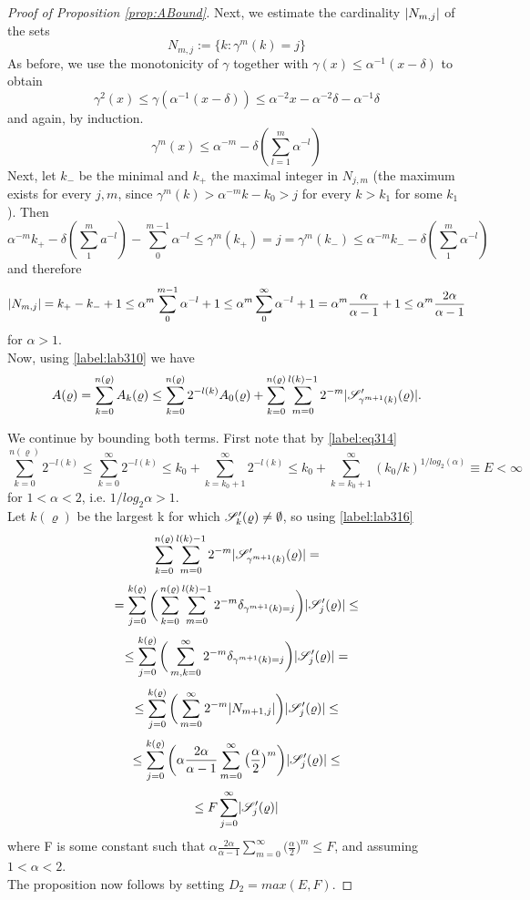 \documentclass[11pt,reqno]{article}
\DeclarePairedDelimiter\abs{\lvert}{\rvert}%
\theoremstyle{definition}
\begin{document}
\begin{proof}[Proof of Proposition \eqref{prop:ABound}]
Next, we estimate the cardinality $\abs{N_{m,j}}$ of the sets
$$
N_{m,j} := \{k: \gamma^m(k) = j\}
$$
As before, we use the monotonicity of $\gamma$ together with $\gamma(x) \leq \alpha^{-1}(x-\delta)$ to obtain
$$
\gamma^2(x) \leq \gamma(\alpha^{-1}(x-\delta)) \leq \alpha^{-2}x - \alpha^{-2}\delta - \alpha^{-1}\delta 
$$
and again, by induction.
$$
\gamma^m(x) \leq \alpha^{-m}-\delta(\sum_{l=1}^m\alpha^{-l})
$$
Next, let $k_-$ be the minimal and $k_+$ the maximal integer in $N_{j,m}$ (the maximum exists for every $j,m$, since $\gamma^m(k) > \alpha^{-m}k - k_0 > j$ for every $k>k_1$ for some $k_1$). Then
$$
\alpha^{-m}k_+ - \delta(\sum_1^ma^{-l})-\sum_0^{m-1}\alpha^{-l} \leq \gamma^m(k_+) = j = \gamma^m(k_-) \leq \alpha^{-m}k_- - \delta(\sum_1^m\alpha^{-l})
$$
and therefore
\begin{equation} \label{label:lab316}
\abs{N_{m,j}} = k_+ - k_- + 1 \leq \alpha^m \sum_0^{m-1}\alpha^{-l} + 1 \leq \alpha^m \sum_0^{\infty}\alpha^{-l} + 1 = \alpha^m \frac{\alpha}{\alpha-1} + 1 \leq \alpha^m \frac{2\alpha}{\alpha-1}
\end{equation}
for $\alpha > 1$.\\

Now, using \eqref{label:lab310} we have
\begin{equation} 
A(\varrho) = \sum_{k=0}^{n(\varrho)}A_k(\varrho) \leq 
\sum_{k=0}^{n(\varrho)} 2^{-l(k)}A_0(\varrho) + 
\sum_{k=0}^{n(\varrho)}\sum_{m=0}^{l(k)-1} 2^{-m} \abs{\mathscr{S}^\prime_{\gamma^{m+1}(k)}(\varrho)} .
\end{equation}

We continue by bounding both terms. First note that by \eqref{label:eq314}
$$
\sum_{k=0}^{n(\varrho)} 2^{-l(k)} \leq \sum_{k=0}^{\infty} 2^{-l(k)} \leq k_0 + \sum_{k=k_0+1}^{\infty} 2^{-l(k)} \leq k_0 + \sum_{k=k_0+1}^{\infty}(k_0/k)^{1/log_2(\alpha)} \equiv E < \infty
$$
for $1 < \alpha < 2$, i.e. $1/log_2\alpha > 1$. \\
Let $k(\varrho)$ be the largest k for which $\mathscr{S}^\prime_k(\varrho) \neq \emptyset$, so using \eqref{label:lab316}
$$
\sum_{k=0}^{n(\varrho)}\sum_{m=0}^{l(k)-1} 2^{-m} \abs{\mathscr{S}^\prime_{\gamma^{m+1}(k)}(\varrho)} = 
$$
$$
=\sum_{j=0}^{k(\varrho)} \bigg( \sum_{k=0}^{n(\varrho)}\sum_{m=0}^{l(k)-1} 2^{-m} \delta_{\gamma^{m+1}(k) = j} \bigg) \abs{\mathscr{S}^\prime_{j}(\varrho)} \leq
$$
$$
\leq \sum_{j=0}^{k(\varrho)} \bigg( \sum_{m,k=0}^{\infty} 2^{-m} \delta_{\gamma^{m+1}(k) = j} \bigg) \abs{\mathscr{S}^\prime_{j}(\varrho)} = 
$$
$$
\leq \sum_{j=0}^{k(\varrho)} \bigg( \sum_{m=0}^{\infty} 2^{-m} \abs{N_{m+1,j}} \bigg) \abs{\mathscr{S}^\prime_{j}(\varrho)} \leq
$$
$$
\leq \sum_{j=0}^{k(\varrho)} \bigg( \alpha \frac{2\alpha}{\alpha-1} \sum_{m=0}^{\infty} \big( \frac{\alpha}{2} \big) ^m \bigg) \abs{\mathscr{S}^\prime_{j}(\varrho)} \leq
$$
$$
\leq F\sum_{j=0}^{\infty} \abs{\mathscr{S}^\prime_{j}(\varrho)}
$$
where F is some constant such that $\alpha \frac{2\alpha}{\alpha-1} \sum_{m=0}^{\infty} \big( \frac{\alpha}{2} \big) ^m \leq F$, and assuming $1 < \alpha < 2$.\\
The proposition now follows by setting $D_2 = max(E,F)$.
\end{proof}
\end{document}
